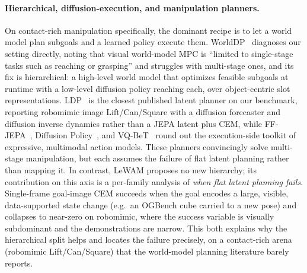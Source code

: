 \paragraph{Hierarchical, diffusion-execution, and manipulation planners.}
On contact-rich manipulation specifically, the dominant recipe is to let a world model plan subgoals and a learned policy execute them. WorldDP~\cite{worlddp} diagnoses our setting directly, noting that visual world-model MPC is ``limited to single-stage tasks such as reaching or grasping'' and struggles with multi-stage ones, and its fix is hierarchical: a high-level world model that optimizes feasible subgoals at runtime with a low-level diffusion policy reaching each, over object-centric slot representations. LDP~\cite{ldp} is the closest published latent planner on our benchmark, reporting robomimic image Lift/Can/Square with a diffusion forecaster and diffusion inverse dynamics rather than a JEPA latent plus CEM, while FF-JEPA~\cite{ffjepa}, Diffusion Policy~\cite{diffusionpolicy}, and VQ-BeT~\cite{vqbet} round out the execution-side toolkit of expressive, multimodal action models. These planners convincingly solve multi-stage manipulation, but each assumes the failure of flat latent planning rather than mapping it. In contrast, LeWAM proposes no new hierarchy; its contribution on this axis is a per-family analysis of \emph{when flat latent planning fails}. Single-frame goal-image CEM succeeds when the goal encodes a large, visible, data-supported state change (e.g.\ an OGBench cube carried to a new pose) and collapses to near-zero on robomimic, where the success variable is visually subdominant and the demonstrations are narrow. This both explains why the hierarchical split helps and locates the failure precisely, on a contact-rich arena (robomimic Lift/Can/Square) that the world-model planning literature barely reports.

